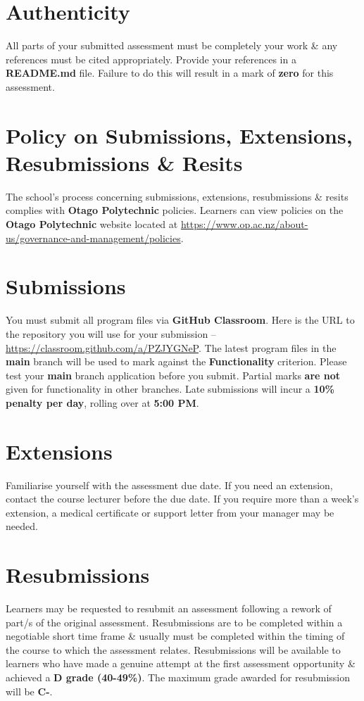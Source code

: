 \documentclass{article}
\begin{document}
\section*{Authenticity}
All parts of your submitted assessment must be completely your work \& any references must be cited appropriately. Provide your references in a \textbf{README.md} file. Failure to do this will result in a mark of \textbf{zero} for this assessment.

\section*{Policy on Submissions, Extensions, Resubmissions \& Resits}
The school's process concerning submissions, extensions, resubmissions \& resits complies with \textbf{Otago Polytechnic} policies. Learners can view policies on the \textbf{Otago Polytechnic} website located at \href{https://www.op.ac.nz/about-us/governance-and-management/policies}{https://www.op.ac.nz/about-us/governance-and-management/policies}.

\section*{Submissions}
You must submit all program files via \textbf{GitHub Classroom}. Here is the URL to the repository you will use for your submission – \href{https://classroom.github.com/a/PZJYGNeP}{https://classroom.github.com/a/PZJYGNeP}. The latest program files in the \textbf{main} branch will be used to mark against the \textbf{Functionality} criterion. Please test your \textbf{main} branch application before you submit. Partial marks \textbf{are not} given for functionality in other branches. Late submissions will incur a \textbf{10\% penalty per day}, rolling over at \textbf{5:00 PM}.

\section*{Extensions}
Familiarise yourself with the assessment due date. If you need an extension, contact the course lecturer before the due date. If you require more than a week's extension, a medical certificate or support letter from your manager may be needed.

\section*{Resubmissions}
Learners may be requested to resubmit an assessment following a rework of part/s of the original assessment. Resubmissions are to be completed within a negotiable short time frame \& usually must be completed within the timing of the course to which the assessment relates. Resubmissions will be available to learners who have made a genuine attempt at the first assessment opportunity \& achieved a \textbf{D grade (40-49\%)}. The maximum grade awarded for resubmission will be \textbf{C-}.
\end{document}
